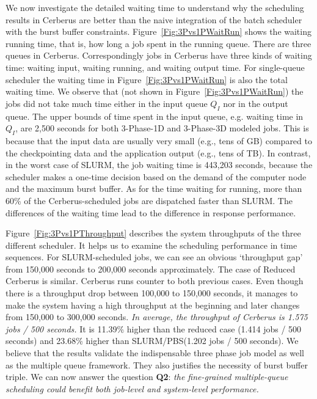 We now investigate the detailed waiting time to understand why the scheduling results in Cerberus
are better than the naive integration of the batch scheduler with the burst buffer constraints.
Figure~\ref{Fig:3Pvs1PWaitRun} shows the waiting running time, that is, how long a job spent in the running queue.
There are three queues in Cerberus.
Correspondingly jobs in Cerberus have three kinds of waiting time: waiting input, waiting running, and waiting output time.
For single-queue scheduler the waiting time in Figure~\ref{Fig:3Pvs1PWaitRun} is also the total waiting time.
We observe that (not shown in Figure~\ref{Fig:3Pvs1PWaitRun}) the jobs did not
take much time either in the input queue $Q_I$ nor in the output queue.
The upper bounds of time spent in the input queue, e.g. waiting time in $Q_I$, are 
2,500 seconds for both 3-Phase-1D and 3-Phase-3D modeled jobs.
This is because that the input data are usually very small (e.g., tens of GB)
compared to the checkpointing data and the application output (e.g., tens of TB).
In contrast, in the worst case of SLURM, the job waiting time is 443,203 seconds,
because the scheduler makes a one-time decision based on the demand of the computer node and the maximum burst buffer.
As for the time waiting for running, more than 60\% of the Cerberus-scheduled jobs are dispatched faster than SLURM.
The differences of the waiting time lead to the difference in response performance.

Figure~\ref{Fig:3Pvs1PThroughput} describes the system throughputs of the three different scheduler.
It helps us to examine the scheduling performance in time sequences.
For SLURM-scheduled jobs, we can see an obvious `throughput gap'
from 150,000 seconds to 200,000 seconds approximately.
The case of Reduced Cerberus is similar.
Cerberus runs counter to both previous cases.
Even though there is a throughput drop between 100,000 to 150,000 seconds,
it manages to make the system having a high throughput at the beginning and
later changes from 150,000 to 300,000 seconds.
\textit{In average, the throughput of Cerberus is 1.575 jobs / 500 seconds.}
It is 11.39\% higher than the reduced case (1.414 jobs / 500 seconds) and
23.68\% higher than SLURM/PBS(1.202 jobs / 500 seconds).
We believe that the results validate the indispensable three phase job model as well as
the multiple queue framework.
They also justifies the necessity of burst buffer triple.
We can now answer the question \textbf{Q2}:
\textit{the fine-grained multiple-queue scheduling could benefit both job-level and system-level performance.}

